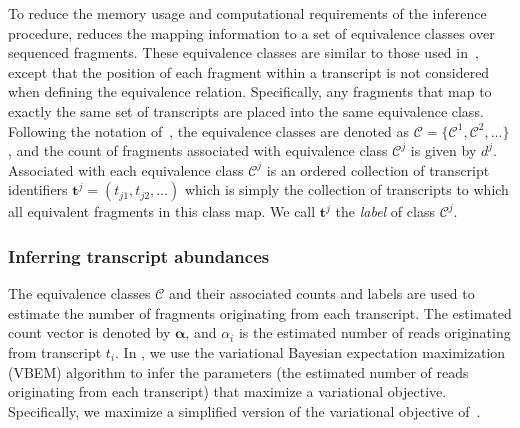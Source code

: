 To reduce the memory usage and computational requirements of the inference procedure, \quasiSF reduces the mapping information to a set of equivalence classes over sequenced fragments.  These equivalence classes are similar to those used in~\citet{isoem}, except that the position of each fragment within a transcript is not considered when defining the equivalence relation.  Specifically, any fragments that map to exactly the same set of transcripts are placed into the same equivalence class. Following the notation of~\citet{salmon}, the equivalence classes are denoted as $\bm{\mathcal{C}} = \{\mathcal{C}^{1}, \mathcal{C}^{2}, \dots \}$, and the count of fragments associated with equivalence class $\mathcal{C}^{j}$ is given by $d^j$.  Associated with each equivalence class $\mathcal{C}^{j}$ is an ordered collection of transcript identifiers $\mathbf{t}^{j} = \left(t_{j1}, t_{j2}, \dots\right)$ which is simply the collection of transcripts to which all equivalent fragments in this class map.  We call $\mathbf{t}^{j}$ the \textit{label} of class $\mathcal{C}^{j}$.

\subsubsection{Inferring transcript abundances}

The equivalence classes $\bm{\mathcal{C}}$ and their associated counts and labels are used to estimate the number of fragments originating from each transcript.  The estimated count vector is denoted by $\bm{\alpha}$, and $\alpha_i$ is the estimated number of reads originating from transcript $t_i$. In \quasiSF, we use the variational Bayesian expectation maximization (VBEM) algorithm to infer the parameters (the estimated number of reads originating from each transcript) that maximize a variational objective.  Specifically, we maximize a simplified version of the variational objective of~\citet{tigar}.

